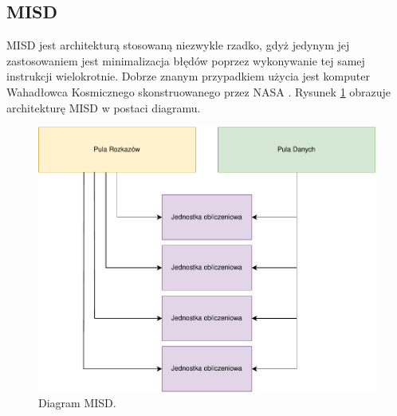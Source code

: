 \documentclass[a4paper,12pt]{book} %
\begin{document}
\subsection {MISD}
MISD jest architekturą stosowaną niezwykle rzadko, gdyż jedynym jej zastosowaniem jest minimalizacja błędów poprzez wykonywanie tej samej instrukcji wielokrotnie. Dobrze znanym przypadkiem użycia jest komputer Wahadłowca Kosmicznego skonstruowanego przez NASA \cite{SpaceShuttle}. Rysunek \ref{fig:misd} obrazuje architekturę MISD w postaci diagramu.
\begin{figure}
	\centering
	\includegraphics[scale=1]{assets/MISD.pdf}
	\caption{Diagram MISD.}
	\label{fig:misd}
\end{figure}
\end{document}
